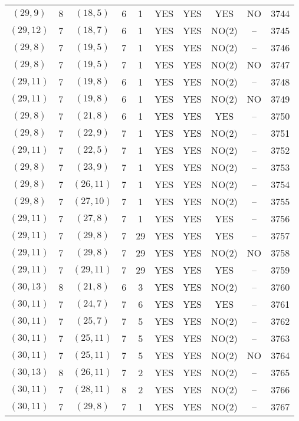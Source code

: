 \begin{longtable}{|c|c|c|c|c|c|c|c|c|c|}
$(29, 9)$ & 8 & $(18, 5)$ & 6 & 1 & YES & YES & YES & NO & 3744\\
$(29, 12)$ & 7 & $(18, 7)$ & 6 & 1 & YES & YES & NO(2) & -- & 3745\\
$(29, 8)$ & 7 & $(19, 5)$ & 7 & 1 & YES & YES & NO(2) & -- & 3746\\
$(29, 8)$ & 7 & $(19, 5)$ & 7 & 1 & YES & YES & NO(2) & NO & 3747\\
$(29, 11)$ & 7 & $(19, 8)$ & 6 & 1 & YES & YES & NO(2) & -- & 3748\\
$(29, 11)$ & 7 & $(19, 8)$ & 6 & 1 & YES & YES & NO(2) & NO & 3749\\
$(29, 8)$ & 7 & $(21, 8)$ & 6 & 1 & YES & YES & YES & -- & 3750\\
$(29, 8)$ & 7 & $(22, 9)$ & 7 & 1 & YES & YES & NO(2) & -- & 3751\\
$(29, 11)$ & 7 & $(22, 5)$ & 7 & 1 & YES & YES & NO(2) & -- & 3752\\
$(29, 8)$ & 7 & $(23, 9)$ & 7 & 1 & YES & YES & NO(2) & -- & 3753\\
$(29, 8)$ & 7 & $(26, 11)$ & 7 & 1 & YES & YES & NO(2) & -- & 3754\\
$(29, 8)$ & 7 & $(27, 10)$ & 7 & 1 & YES & YES & NO(2) & -- & 3755\\
$(29, 11)$ & 7 & $(27, 8)$ & 7 & 1 & YES & YES & YES & -- & 3756\\
$(29, 11)$ & 7 & $(29, 8)$ & 7 & 29 & YES & YES & YES & -- & 3757\\
$(29, 11)$ & 7 & $(29, 8)$ & 7 & 29 & YES & YES & NO(2) & NO & 3758\\
$(29, 11)$ & 7 & $(29, 11)$ & 7 & 29 & YES & YES & YES & -- & 3759\\
$(30, 13)$ & 8 & $(21, 8)$ & 6 & 3 & YES & YES & NO(2) & -- & 3760\\
$(30, 11)$ & 7 & $(24, 7)$ & 7 & 6 & YES & YES & YES & -- & 3761\\
$(30, 11)$ & 7 & $(25, 7)$ & 7 & 5 & YES & YES & NO(2) & -- & 3762\\
$(30, 11)$ & 7 & $(25, 11)$ & 7 & 5 & YES & YES & NO(2) & -- & 3763\\
$(30, 11)$ & 7 & $(25, 11)$ & 7 & 5 & YES & YES & NO(2) & NO & 3764\\
$(30, 13)$ & 8 & $(26, 11)$ & 7 & 2 & YES & YES & NO(2) & -- & 3765\\
$(30, 11)$ & 7 & $(28, 11)$ & 8 & 2 & YES & YES & NO(2) & -- & 3766\\
$(30, 11)$ & 7 & $(29, 8)$ & 7 & 1 & YES & YES & NO(2) & -- & 3767\\

\end{longtable}
